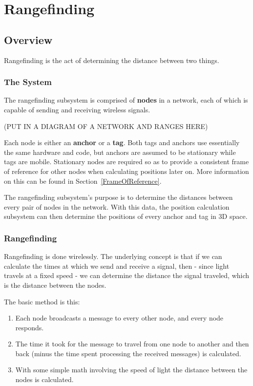 
\chapter{Rangefinding} %

\label{Rangefinding}


\section{Overview}
 Rangefinding is the act of determining the distance between two things.
 
\subsection{The System}
The rangefinding subsystem is comprised of \textbf{nodes} in a network, each of which is capable of sending and receiving wireless signals.

(PUT IN A DIAGRAM OF A NETWORK AND RANGES HERE)

Each node is either an \textbf{anchor} or a \textbf{tag}. Both tags and anchors use essentially the same hardware and code, but anchors are assumed to be stationary while tags are mobile. Stationary nodes are required so as to provide a consistent frame of reference for other nodes when calculating positions later on. More information on this can be found in Section~\ref{FrameOfReference}.

The rangefinding subsystem's purpose is to determine the distances between every pair of nodes in the network. With this data, the position calculation subsystem can then determine the positions of every anchor and tag in 3D space.

\subsection{Rangefinding}
Rangefinding is done wirelessly. The underlying concept is that if we can calculate the times at which we send and receive a signal, then - since light travels at a fixed speed - we can determine the distance the signal traveled, which is the distance between the nodes. 

The basic method is this: 
\begin{enumerate}
	\item Each node broadcasts a message to every other node, and every node responds. 
	\item The time it took for the message to travel from one node to another and then back (minus the time spent processing the received messages) is calculated.
	\item With some simple math involving the speed of light the distance between the nodes is calculated. 
\end{enumerate}

